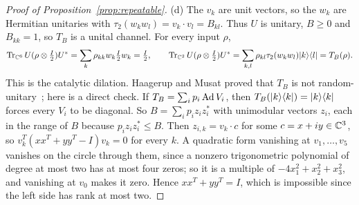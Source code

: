 \begin{proof}[Proof of Proposition~\ref{prop:repeatable}]
(d) The $v_k$ are unit vectors, so the $w_k$ are Hermitian unitaries
with $\tau_2(w_kw_l)=v_k\cdot v_l=B_{kl}$. Thus $U$ is unitary, $B\geq0$
and $B_{kk}=1$, so $T_B$ is a unital channel. For every input $\rho$,
\[
 \operatorname{Tr}_{\mathbb C^6}U(\rho\otimes\tfrac I2)U^*=\sum_k\rho_{kk}w_k\tfrac I2w_k=\tfrac I2,
 \qquad
 \operatorname{Tr}_{\mathbb C^2}U(\rho\otimes\tfrac I2)U^*=\sum_{k,l}\rho_{kl}\tau_2(w_kw_l)\lvert k\rangle\langle l\rvert=T_B(\rho).
\]
This is the catalytic dilation. Haagerup and Musat proved that $T_B$ is
not random-unitary~\cite[Example~3.3]{HaagerupMusat2011}; here is a
direct check. If $T_B=\sum_ip_i\operatorname{Ad} V_i$, then $T_B(\lvert k\rangle\langle k\rvert)=\lvert k\rangle\langle k\rvert$
forces every $V_i$ to be diagonal. So $B=\sum_ip_iz_iz_i^*$ with
unimodular vectors $z_i$, each in the range of $B$ because
$p_iz_iz_i^*\leq B$. Then $z_{i,k}=v_k\cdot c$ for some $c=x+iy\in\mathbb C^3$,
so $v_k^T(xx^T+yy^T-I)v_k=0$ for every $k$. A quadratic form vanishing at
$v_1,\dots,v_5$ vanishes on the circle through them, since a nonzero
trigonometric polynomial of degree at most two has at most four zeros;
so it is a multiple of $-4x_1^2+x_2^2+x_3^2$, and vanishing at $v_0$
makes it zero. Hence $xx^T+yy^T=I$, which is impossible since the left
side has rank at most two.
\end{proof}
